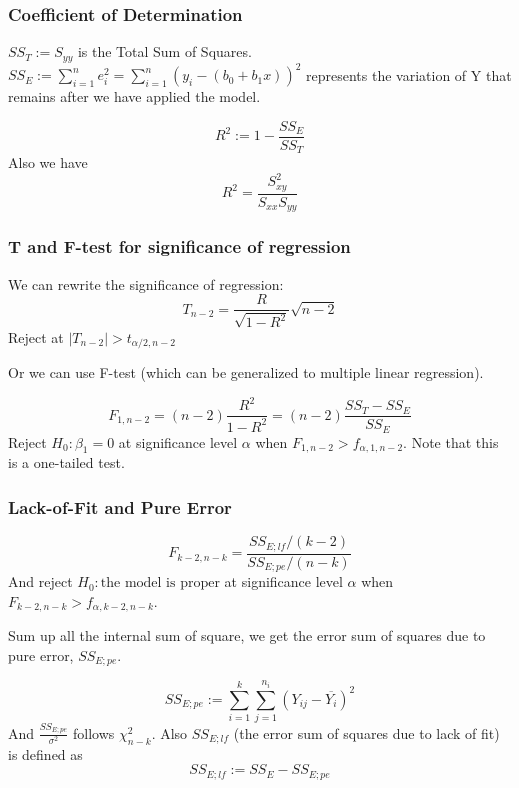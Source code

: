 \documentclass{beamer}
\begin{document}
\begin{frame}
    \frametitle{Coefficient of Determination}

    $SS_{T}:=S_{yy}$ is the Total Sum of Squares. $SS_{E}:=\sum\limits_{i=1}^{n} e_i^2=\sum\limits_{i=1}^{n} (y_i-(b_0+b_1 x))^2$ represents the variation of Y that remains after we have applied the
    model.\par
    \[R^2:=1-\frac{SS_{E}}{SS_{T}}\]
    Also we have 
    \[R^2=\frac{S_{xy}^2}{S_{xx}S_{yy}}\]
    

\end{frame}

\begin{frame}
    \frametitle{T and F-test for significance of regression}
    We can rewrite the significance of regression:
    \[T_{n-2}=\frac{R}{\sqrt{1-R^2}}\sqrt{n-2}\]
    Reject at $|T_{n-2}|>t_{\alpha/2,n-2}$\par
    Or we can use F-test (which can be generalized to multiple linear regression).\par
    \[F_{1,n-2}=(n-2)\frac{R^2}{1-R^2}=(n-2)\frac{SS_{T}-SS_{E}}{SS_{E}}\]
    Reject $H_0: \beta_1=0$ at significance level $\alpha$ when $F_{1,n-2}>f_{\alpha,1, n-2}$. Note that this is a one-tailed test.\par
    

\end{frame}

\begin{frame}
    \frametitle{Lack-of-Fit and Pure Error}

    \[F_{k-2,n-k}=\frac{SS_{E;lf}/(k-2)}{SS_{E;pe}/(n-k)}\]
    And reject $H_0: \text{the model is proper}$ at significance level $\alpha$ when $F_{k-2,n-k}>f_{\alpha,k-2,n-k}$.\par
    Sum up all the internal sum of square, we get the error sum of squares due to pure error, $SS_{E;pe}$.\par
    \[SS_{E;pe}:=\sum\limits_{i=1}^{k}\sum\limits_{j=1}^{n_i}(Y_{ij}-\overline{Y_i})^2\]
    And $\frac{SS_{E;pe}}{\sigma^2}$ follows $\chi^2_{n-k}$. Also $SS_{E;lf}$ (the error sum of squares due to lack of fit) is defined as
    \[SS_{E;lf}:=SS_E-SS_{E;pe}\]

\end{frame}
\end{document}
